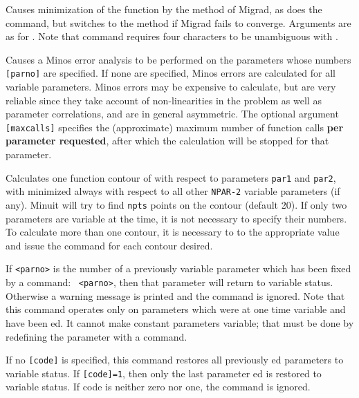
Causes minimization of the function by the method of Migrad,
as does the  command, but switches to the  method
if Migrad fails to converge. Arguments are as for .
Note that command requires four characters to be unambiguous with .


Causes a Minos error analysis to be performed on the parameters whose
numbers \texttt{[parno]} are specified.  If none are specified, Minos errors
are calculated for all variable parameters.
Minos errors may be expensive to calculate, but are very reliable since
they take account of non-linearities in the problem as well as
parameter correlations, and are in general asymmetric.
The optional argument \texttt{[maxcalls]} specifies the (approximate) maximum
number of function calls {\bf per parameter requested},
after which the calculation will be stopped for that parameter.


Calculates one function contour of  with respect to parameters
\texttt{par1} and \texttt{par2}, with  
minimized always with respect to all other
\texttt{NPAR-2} variable parameters (if any). 
Minuit will try to find \texttt{npts} points on the contour (default 20).  
If only two parameters are variable
at the time, it is not necessary to specify their numbers. 
To calculate
more than one contour, it is necessary to  
to the appropriate
value and issue the  command for each contour desired.


If \texttt{<parno>} is the number of a previously variable parameter which has
been fixed by a command:
~\texttt{<parno>}, then that parameter will
return to variable status.  Otherwise a warning message is printed
and the command is ignored.
Note that this command operates only on parameters which were at one time
variable and have been ed.
It cannot make constant parameters variable;
that must be done by redefining the parameter with a  command.


If no \texttt{[code]} is specified, this command restores all previously 
ed parameters to variable status. 
If \texttt{[code]=1}, then only the last parameter
ed is restored to variable status.  
If code is neither zero nor one, the command is ignored.

